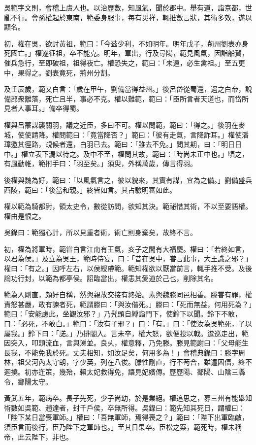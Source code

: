 
\begin{pinyinscope}
吳範字文則，會稽上虞人也。以治歷數，知風氣，聞於郡中。舉有道，詣京都，世亂不行。會孫權起於東南，範委身服事，每有災祥，輒推數言狀，其術多效，遂以顯名。

初，權在吳，欲討黃祖，範曰：「今茲少利，不如明年。明年戊子，荊州劉表亦身死國亡。」權遂征祖，卒不能克。明年，軍出，行及尋陽，範見風氣，因詣船賀，催兵急行，至即破祖，祖得夜亡。權恐失之，範曰：「未遠，必生禽祖。」至五更中，果得之。劉表竟死，荊州分割。

及壬辰歲，範又白言：「歲在甲午，劉備當得益州。」後呂岱從蜀還，遇之白帝，說備部衆離落，死亡且半，事必不克。權以難範，範曰：「臣所言者天道也，而岱所見者人事耳。」備卒得蜀。

權與呂蒙謀襲關羽，議之近臣，多曰不可。權以問範，範曰：「得之。」後羽在麥城，使使請降。權問範曰：「竟當降否？」範曰：「彼有走氣，言降詐耳。」權使潘璋邀其徑路，覘候者還，白羽已去。範曰：「雖去不免。」問其期，曰：「明日日中。」權立表下漏以待之。及中不至，權問其故，範曰：「時尚未正中也。」頃之，有風動帷，範拊手曰：「羽至矣。」須臾，外稱萬歲，傳言得羽。

後權與魏為好，範曰：「以風氣言之，彼以貌來，其實有謀，宜為之備。」劉備盛兵西陵，範曰：「後當和親。」終皆如言。其占驗明審如此。

權以範為騎都尉，領太史令，數從訪問，欲知其決。範祕惜其術，不以至要語權。權由是恨之。

吳錄曰：範獨心計，所以見重者術，術亡則身棄矣，故終不言。

初，權為將軍時，範甞白言江南有王氣，亥子之間有大福慶。權曰：「若終如言，以君為侯。」及立為吳王，範時侍宴，曰：「昔在吳中，甞言此事，大王識之邪？」權曰：「有之。」因呼左右，以侯綬帶範。範知權欲以厭當前言，輒手推不受。及後論功行封，以範為都亭侯。詔臨當出，權恚其愛道於己也，削除其名。

範為人剛直，頗好自稱，然與親故交接有終始。素與魏滕同邑相善。滕甞有罪，權責怒甚嚴，敢有諫者死，範謂滕曰：「與汝偕死。」滕曰：「死而無益，何用死為？」範曰：「安能慮此，坐觀汝邪？」乃髠頭自縛詣門下，使鈴下以聞。鈴下不敢，曰：「必死，不敢白。」範曰：「汝有子邪？」曰：「有。」曰：「使汝為吳範死，子以屬我。」鈴下曰：「諾。」乃排閤入。言未卒，權大怒，欲便投以戟。逡巡走出，範因突入，叩頭流血，言與涕並。良乆，權意釋，乃免滕。滕見範謝曰：「父母能生長我，不能免我於死。丈夫相知，如汝足矣，何用多為！」會稽典錄曰：滕字周林，祖父河內太守朗，字少英，列在八俊。滕性剛直，行不苟合，雖遭困偪，終不迴撓。初亦迕策，幾殆，賴太妃救得免，語見妃嬪傳。歷歷陽、鄱陽、山陰三縣令，鄱陽太守。

黃武五年，範病卒。長子先死，少子尚幼，於是業絕。權追思之，募三州有能舉知術數如吳範、趙達者，封千戶侯，卒無所得。吳錄曰：範先知其死日，謂權曰：「陛下某日當喪軍師。」權曰：「吾無軍師，焉得喪之？」範曰：「陛下出軍臨敵，須臣言而後行，臣乃陛下之軍師也。」至其日果卒。臣松之案，範死時，權未稱帝，此云陛下，非也。


\end{pinyinscope}